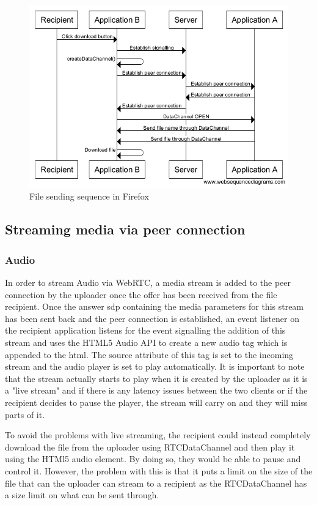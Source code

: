 \documentclass[]{report}
\begin{document}
			\begin{figure}[H]
				\caption{File sending sequence in Firefox}
				\centering
				\includegraphics[scale=0.5]{file-sending-sequence-firefox.png}
			\end{figure}	
			
			\subsection{Streaming media via peer connection}
				\subsubsection{Audio}
				In order to stream Audio via WebRTC, a media stream is added to the peer connection by the uploader once the offer has been received from the file recipient. Once the answer sdp containing the media parameters for this stream has been sent back and the peer connection is established, an event listener on the recipient application listens for the event signalling the addition of this stream and uses the HTML5 Audio API to create a new audio tag which is appended to the html. The source attribute of this tag is set to the incoming stream and the audio player is set to play automatically. It is important to note that the stream actually starts to play when it is created by the uploader as it is a "live stream" and if there is any latency issues between the two clients or if the recipient decides to pause the player, the stream will carry on and they will miss parts of it.
				
				To avoid the problems with live streaming, the recipient could instead completely download the file from the uploader using RTCDataChannel and then play it using the HTMl5 audio element. By doing so, they would be able to pause and control it. However, the problem with this is that it puts a limit on the size of the file that can the uploader can stream to a recipient as the RTCDataChannel has a size limit on what can be sent through.
\end{document}
